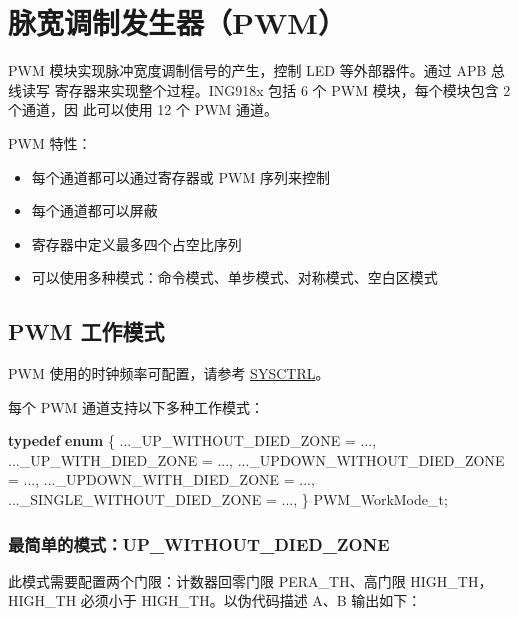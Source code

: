 \documentclass[
  12pt,
]{book}
\newenvironment{Shaded}{\begin{snugshade}}{\end{snugshade}}
\newcommand{\KeywordTok}[1]{\textcolor[rgb]{0.13,0.29,0.53}{\textbf{#1}}}
\newcommand{\NormalTok}[1]{#1}
\providecommand{\tightlist}{%
  \setlength{\itemsep}{0pt}\setlength{\parskip}{0pt}}
\begin{document}
\hypertarget{ch-pwm}{%
\chapter{脉宽调制发生器（PWM）}\label{ch-pwm}}

PWM 模块实现脉冲宽度调制信号的产生，控制 LED 等外部器件。通过 APB 总线读写
寄存器来实现整个过程。ING918x 包括 6 个 PWM 模块，每个模块包含 2 个通道，因
此可以使用 12 个 PWM 通道。

PWM 特性：

\begin{itemize}
\tightlist
\item
  每个通道都可以通过寄存器或 PWM 序列来控制
\item
  每个通道都可以屏蔽
\item
  寄存器中定义最多四个占空比序列
\item
  可以使用多种模式：命令模式、单步模式、对称模式、空白区模式
\end{itemize}

\hypertarget{pwm-ux5de5ux4f5cux6a21ux5f0f}{%
\section{PWM 工作模式}\label{pwm-ux5de5ux4f5cux6a21ux5f0f}}

PWM 使用的时钟频率可配置，请参考 \protect\hyperlink{ch-sysctrl}{SYSCTRL}。

每个 PWM 通道支持以下多种工作模式：

\begin{Shaded}
\begin{Highlighting}[]
\KeywordTok{typedef} \KeywordTok{enum}
\NormalTok{\{}
\NormalTok{    ..._UP_WITHOUT_DIED_ZONE          = ...,}
\NormalTok{    ..._UP_WITH_DIED_ZONE             = ...,}
\NormalTok{    ..._UPDOWN_WITHOUT_DIED_ZONE      = ...,}
\NormalTok{    ..._UPDOWN_WITH_DIED_ZONE         = ...,}
\NormalTok{    ..._SINGLE_WITHOUT_DIED_ZONE      = ...,}
\NormalTok{\} PWM_WorkMode_t;}
\end{Highlighting}
\end{Shaded}

\hypertarget{ux6700ux7b80ux5355ux7684ux6a21ux5f0fup_without_died_zone}{%
\subsection{最简单的模式：UP\_WITHOUT\_DIED\_ZONE}\label{ux6700ux7b80ux5355ux7684ux6a21ux5f0fup_without_died_zone}}

此模式需要配置两个门限：计数器回零门限 PERA\_TH、高门限 HIGH\_TH，HIGH\_TH
必须小于 HIGH\_TH。以伪代码描述 A、B 输出如下：
\end{document}
